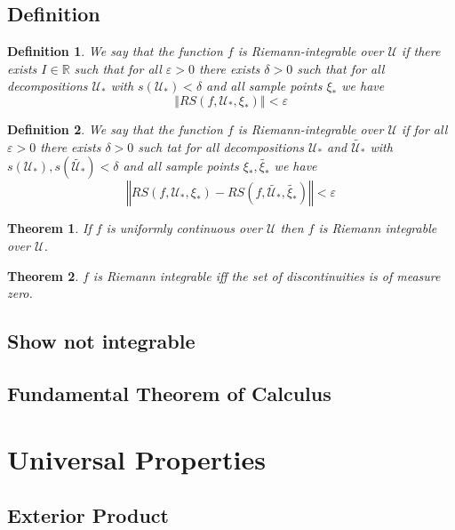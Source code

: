 \documentclass[12pt]{amsart}
\newtheorem{theorem}{Theorem}[section]
\newtheorem{definition}{Definition}[section]
\newcommand{\U}{\mathcal{U}}
\newcommand{\R}{\mathbb{R}}
\newcommand{\abs}[1]{\left\Vert{#1}\right\Vert}
\newcommand{\e}{\varepsilon}
\newcommand{\de}{\delta}
\begin{document}
\subsection{Definition}%
\label{sub:definition}

\begin{definition}
  We say that the function $f$ is Riemann-integrable over $\U$ if there exists
  $I\in\R$ such that for all $\e>0$ there exists $\de>0$ such that for all
  decompositions $\U_*$ with $s(\U_*)<\de$ and all sample points $\xi_*$ we
  have
  \[
    \abs{RS(f,\U_*,\xi_*)}<\e
  \]
\end{definition}

\begin{definition}
  We say that the function $f$ is Riemann-integrable over $\U$ if for all
  $\e>0$ there exists $\de>0$ such tat for all decompositions $\U_*$ and
  $\widetilde{\U_*}$ with $s(\U_*),s(\widetilde{\U_*})<\de$ and all sample
  points $\xi_*,\widetilde{\xi_*}$ we have
  \[
    \abs{RS(f,\U_*,\xi_*)-RS(f,\widetilde{\U_*},\widetilde{\xi_*})} < \e
  \]
\end{definition}

\begin{theorem}
  If $f$ is uniformly continuous over $\U$ then $f$ is Riemann integrable over
  $\U$.
\end{theorem}

\begin{theorem}
  $f$ is Riemann integrable iff the set of discontinuities is of measure zero.
\end{theorem}

\subsection{Show not integrable}%
\label{sub:show_not_integrable}

\subsection{Fundamental Theorem of Calculus}%
\label{sub:fundamental_theorem_of_calculus}

\section{Universal Properties}%
\label{sec:univresal_properties}

\subsection{Exterior Product}%
\label{sub:exterior_product}
\end{document}
